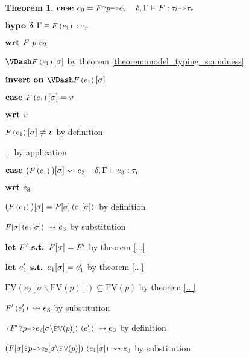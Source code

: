\documentclass[acmsmall]{acmart}
\theoremstyle{definition}
\newtheorem{theorem}{Theorem}[section]
\begin{document}
\begin{theorem}
    \item \Z $\B{case }
      e_0 = \J{$F$?$p$=>$e_2$}
      \I
      \delta, \Gamma \satisfies F \hastype \J{$\tau_l$->$\tau_r$}
    $ 
    \item \Z $\B{hypo }
      \delta, \Gamma \satisfies \J{$F$($e_1$)} \hastype \tau_r
    $
    \item \Z $\textbf{wrt }
      F\ p\ e_2 
    $
      \item \Z\Z $\VDash \J{$F$($e_1$)}[\sigma] $
      by theorem \ref{theorem:model_typing_soundness}
      \item \Z\Z $\B{invert on } \VDash \J{$F$($e_1$)}[\sigma]$
      \item \Z\Z $\B{case } \J{$F$($e_1$)}[\sigma] = v$
      \item \Z\Z $\textbf{wrt } v$
        \item \Z\Z\Z $\J{$F$($e_1$)}[\sigma] \neq v$ by definition 
        \item \Z\Z\Z $\bot$ by application
      \item \Z\Z $\B{case } 
        (\J{$F$($e_1$)})[\sigma] \rightsquigarrow e_3
        \I
        \delta, \Gamma \satisfies e_3 \hastype \tau_r
      $
      \item \Z\Z $\textbf{wrt } e_3$
        \item \Z\Z\Z $(\J{$F$($e_1$)})[\sigma] = \J{$F[\sigma]$($e_1[\sigma]$)}$ by definition
        \item \Z\Z\Z $\J{$F[\sigma]$($e_1[\sigma]$)} \rightsquigarrow e_3$ by substitution 

        \item \Z\Z\Z $\textbf{let } F' \textbf{ s.t. } F[\sigma] = F'$ by theorem \ref{...} 
        \item \Z\Z\Z $\textbf{let } e_1' \textbf{ s.t. } e_1[\sigma] = e_1'$ by theorem \ref{...} 

        \item \Z\Z\Z $\text{FV}(e_2[\sigma\backslash\text{FV}(p)]) \subseteq \text{FV}(p)$ 
        by theorem \ref{...} 

        \item \Z\Z\Z $\J{$F'$($e_1'$)} \rightsquigarrow e_3$ by substitution 
        \item \Z\Z\Z $\J{($F'$?$p$=>$e_2[\sigma\backslash\text{FV}(p)]$)($e_1'$)} \rightsquigarrow e_3$ by definition 
        \item \Z\Z\Z $(\J{$F[\sigma]$?$p$=>$e_2[\sigma\backslash\text{FV}(p)]$)($e_1[\sigma]$)} \rightsquigarrow e_3$ by substitution 


\end{theorem}
\end{document}
